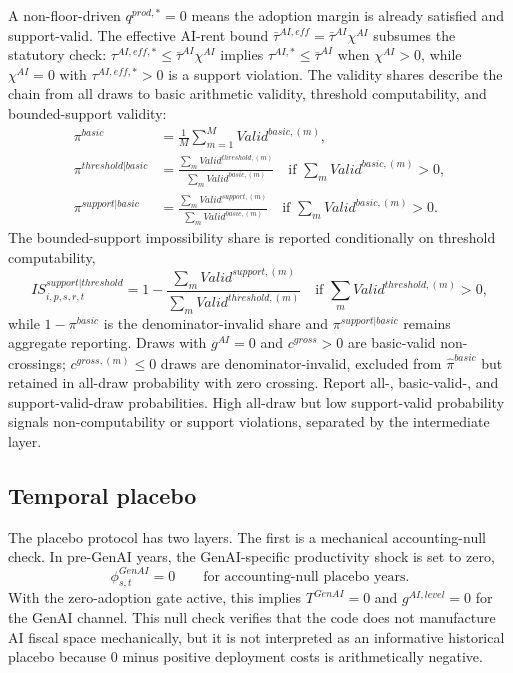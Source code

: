 \documentclass[11pt,a4paper]{article}
\begin{document}
A non-floor-driven $q^{prod,*}=0$ means the adoption margin is already satisfied and support-valid. The effective AI-rent bound $\bar\tau^{AI,eff}=\bar\tau^{AI}\chi^{AI}$ subsumes the statutory check: $\tau^{AI,eff,*}\leq\bar\tau^{AI}\chi^{AI}$ implies $\tau^{AI,*}\leq\bar\tau^{AI}$ when $\chi^{AI}>0$, while $\chi^{AI}=0$ with $\tau^{AI,eff,*}>0$ is a support violation.
The validity shares describe the chain from all draws to basic arithmetic validity, threshold computability, and bounded-support validity:
\begin{align}
    \pi^{basic}&=\frac{1}{M}\sum_{m=1}^{M}Valid^{basic,(m)},\\
    \pi^{threshold|basic}&=\frac{\sum_m Valid^{threshold,(m)}}{\sum_m Valid^{basic,(m)}}
    \quad\text{if }\sum_m Valid^{basic,(m)}>0,\\
    \pi^{support|basic}&=\frac{\sum_m Valid^{support,(m)}}{\sum_m Valid^{basic,(m)}}
    \quad\text{if }\sum_m Valid^{basic,(m)}>0.
\end{align}
The bounded-support impossibility share is reported conditionally on threshold computability,
\begin{equation}
    IS^{support|threshold}_{i,p,s,r,t}
    =1-\frac{\sum_m Valid^{support,(m)}}{\sum_m Valid^{threshold,(m)}}
    \quad\text{if }\sum_m Valid^{threshold,(m)}>0,
\end{equation}
while $1-\pi^{basic}$ is the denominator-invalid share and $\pi^{support|basic}$ remains aggregate reporting. Draws with $g^{AI}=0$ and $c^{gross}>0$ are basic-valid non-crossings; $c^{gross,(m)}\leq0$ draws are denominator-invalid, excluded from $\widehat{\pi}^{basic}$ but retained in all-draw probability with zero crossing. Report all-, basic-valid-, and support-valid-draw probabilities. High all-draw but low support-valid probability signals non-computability or support violations, separated by the intermediate layer.

\subsection{Temporal placebo}

The placebo protocol has two layers. The first is a mechanical accounting-null check. In pre-GenAI years, the GenAI-specific productivity shock is set to zero,
\begin{equation}
    \phi^{GenAI}_{s,t}=0\qquad \text{for accounting-null placebo years.}
\end{equation}
With the zero-adoption gate active, this implies $T^{GenAI}=0$ and $g^{AI,level}=0$ for the GenAI channel. This null check verifies that the code does not manufacture AI fiscal space mechanically, but it is not interpreted as an informative historical placebo because $0$ minus positive deployment costs is arithmetically negative.
\end{document}
